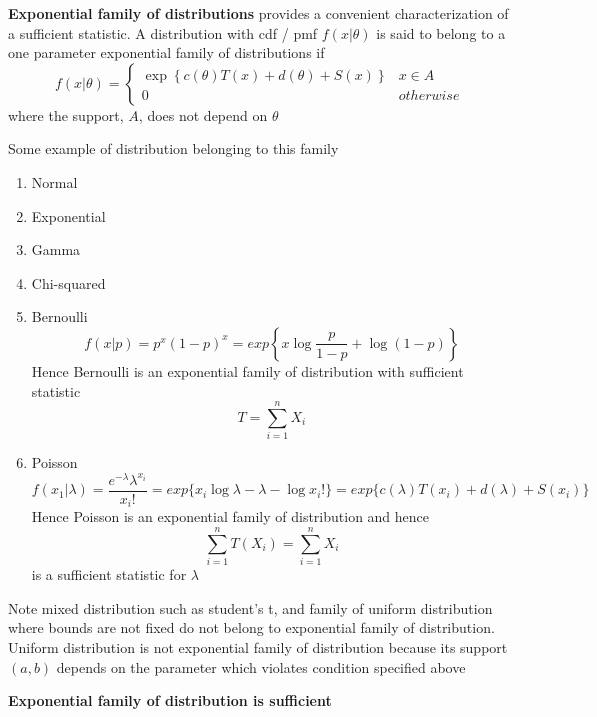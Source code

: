 \documentclass[11pt]{article}
\begin{document}
\begin{defn*}
  \textbf{Exponential family of distributions} provides a convenient characterization of a sufficient statistic. A distribution with cdf / pmf $f(x|\theta)$ is said to belong to a one parameter exponential family of distributions if
  \[
    f(x|\theta) =
    \begin{cases}
      \exp \left\{c(\theta) T(x) + d(\theta) + S(x)\right\} & x\in A\\
      0 & otherwise
    \end{cases}
  \]
  where the support, $A$, does not depend on $\theta$
  \begin{rem}
    Some example of distribution belonging to this family
    \begin{enumerate}
      \item Normal
      \item Exponential
      \item Gamma
      \item Chi-squared
      \item Bernoulli
      \[
        f(x|p) = p^x(1-p)^x = exp\left\{ x\log \frac{p}{1 - p} + \log (1-p)\right\}
      \]
      Hence Bernoulli is an exponential family of distribution with sufficient statistic
      \[
        T = \sum_{i=1}^n X_i
      \]
      \item Poisson
      \[
        f(x_1 | \lambda) = \frac{e^{-\lambda} \lambda^{x_i}}{x_i!} = exp \{  x_i \log \lambda -\lambda - \log x_i!\} = exp \{ c(\lambda)T(x_i) + d(\lambda) + S(x_i)\}
      \]
      Hence Poisson is an exponential family of distribution and hence
      \[
        \sum_{i=1}^n T(X_i) = \sum_{i=1}^n X_i
      \]
      is a sufficient statistic for $\lambda$
    \end{enumerate}
    Note mixed distribution such as student's t, and family of uniform distribution where bounds are not fixed do not belong to exponential family of distribution. Uniform distribution is not exponential family of distribution because its support $(a,b)$ depends on the parameter which violates condition specified above
  \end{rem}
\end{defn*}

\begin{proposition*}
  \textbf{Exponential family of distribution is sufficient}
\end{proposition*}
\end{document}
